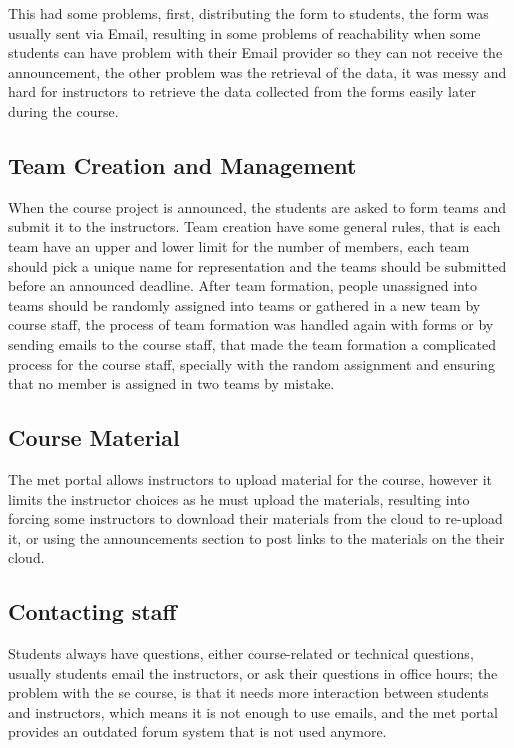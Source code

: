 \newParagraph
This had some problems, first, distributing the form to students, the form was usually sent via Email,
resulting in some problems of reachability when some students can have problem with their Email provider so they can not receive
the announcement, the other problem was the retrieval of the data, it was messy and hard for instructors to retrieve
the data collected from the forms easily later during the course.

\subsection{Team Creation and Management}
\label{sub:team-management}
When the course project is announced, the students are asked to form teams and submit it to the instructors. Team creation
have some general rules, that is each team have an upper and lower limit for the number of members, each team should pick
a unique name for representation and the teams should be submitted before an announced deadline. After team formation, people
unassigned into teams should be randomly assigned into teams or gathered in a new team by course staff, the process of team
formation was handled again with forms or by sending emails to the course staff, that made the team formation a complicated
process for the course staff, specially with the random assignment and ensuring that no member is assigned in two teams
by mistake.

\subsection{Course Material}
\label{sub:course-material}
The \ac{met} portal allows instructors to upload material for the course, however it limits the instructor choices as
he must upload the materials, resulting into forcing some instructors to download their materials from the cloud
to re-upload it, or using the announcements section to post links to the materials on the their cloud.

\subsection{Contacting staff}
\label{sub:contacting-staff}
Students always have questions, either course-related or technical questions, usually students email the instructors, or ask their questions
in office hours; the problem with the \ac{se} course, is that it needs more interaction between students and instructors, which means
it is not enough to use emails, and the \ac{met} portal provides an outdated forum system that is not used anymore.

